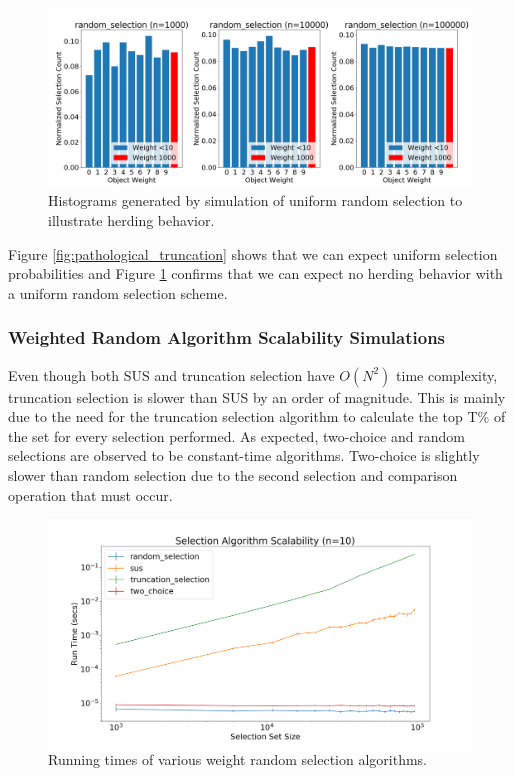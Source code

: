 \documentclass[12pt]{article}
\begin{document}
    \begin{figure}[htbp]
      \centering
      \includegraphics[scale=0.32]{images/pathological_random.png} 
      \caption{Histograms generated by simulation of uniform random selection
               to illustrate herding behavior.}
      \label{fig:pathological_random}
    \end{figure}

    Figure \ref{fig:pathological_truncation} shows that we can expect uniform
    selection probabilities and Figure \ref{fig:pathological_random} confirms
    that we can expect no herding behavior with a uniform random selection
    scheme.

    \subsubsection{Weighted Random Algorithm Scalability Simulations}
    Even though both SUS and truncation selection have $O(N^2)$ time
    complexity, truncation selection is slower than SUS by an order of
    magnitude. This is mainly due to the need for the truncation selection
    algorithm to calculate the top T\% of the set for every selection
    performed. As expected, two-choice and random selections are observed to be
    constant-time algorithms. Two-choice is slightly slower than random
    selection due to the second selection and comparison operation that must
    occur.

    \begin{figure}[htbp]
      \centering
      \includegraphics[scale=0.28]{images/random_scalability.png} 
      \caption{Running times of various weight random selection algorithms.}
      \label{fig:random_scalability}
    \end{figure}
\end{document}
